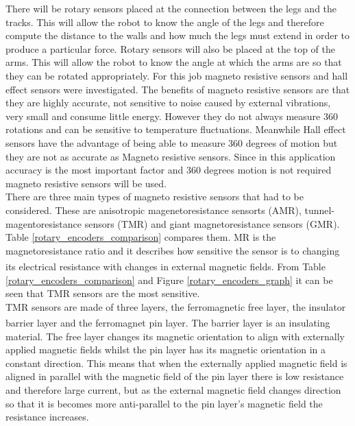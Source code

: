 \documentclass[11pt]{article}		%
\newcommand{\supercite}[1]{\textsuperscript{\cite{#1}}}		%
\begin{document}
            There will be rotary sensors placed at the connection between the legs and the tracks. 
            This will allow the robot to know the angle of the legs and therefore compute the distance to the walls and how much the legs must extend in order to produce a particular force. 
            Rotary sensors will also be placed at the top of the arms. 
            This will allow the robot to know the angle at which the arms are so that they can be rotated appropriately. 
            For this job magneto resistive sensors and hall effect sensors were investigated. 
            The benefits of magneto resistive sensors are that they are highly accurate, not sensitive to noise caused by external vibrations, very small and consume little energy. 
            However they do not always measure 360 rotations and can be sensitive to temperature fluctuations. 
            Meanwhile Hall effect sensors have the advantage of being able to measure 360 degrees of motion but they are not as accurate as Magneto resistive sensors. 
            Since in this application accuracy is the most important factor and 360 degrees motion is not required magneto resistive sensors will be used.
            \\
            There are three main types of magneto resistive sensors that had to be considered.
            These are anisotropic magenetoresistance sensorts (AMR), tunnel-magentoresistance sensors (TMR) and giant magnetoresistance sensors (GMR). 
            Table \ref{rotary_encoders_comparison} compares them. 
            MR is the magnetoresistance ratio and it describes how sensitive the sensor is to changing its electrical resistance with changes in external magnetic fields.\supercite{magnetoresistance} From Table \ref{rotary_encoders_comparison} and Figure \ref{rotary_encoders_graph} it can be seen that TMR sensors are the most sensitive.
            \\
            TMR sensors are made of three layers, the ferromagnetic free layer, the insulator barrier layer and the ferromagnet pin layer.\supercite{Tunnel_magnetoresistance} 
            The barrier layer is an insulating material.
            The free layer changes its magnetic orientation to align with externally applied magnetic fields whilst the pin layer has its magnetic orientation in a constant direction.
            This means that when the externally applied magnetic field is aligned in parallel with the magnetic field of the pin layer there is low resistance and therefore large current, but as the external magnetic field changes direction so that it is becomes more anti-parallel to the pin layer’s magnetic field the resistance increases. 
\end{document}

